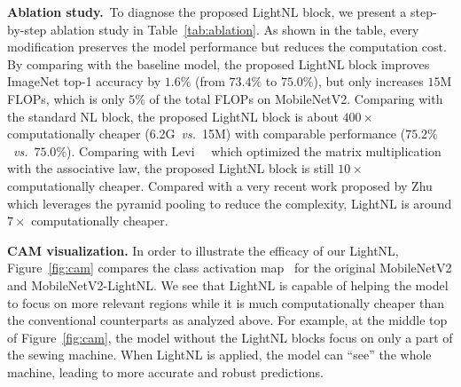 \documentclass[10pt,twocolumn,letterpaper]{article}
\begin{document}
\vspace{0.5ex}\noindent\textbf{Ablation study.}~To diagnose the proposed LightNL block, we present a step-by-step ablation study in Table~\ref{tab:ablation}. As shown in the table, every modification preserves the model performance but reduces the computation cost. By comparing with the baseline model, the proposed LightNL block improves ImageNet top-1 accuracy by $1.6\%$ (from $73.4\%$ to $75.0\%$), but only increases $15$M FLOPs, which is only $5\%$ of the total FLOPs on MobileNetV2. Comparing with the standard NL block, the proposed LightNL block is about $400\times$ computationally cheaper (6.2G~\emph{vs.}~15M) with comparable performance ($75.2\%$~\emph{vs.}~$75.0\%$). Comparing with Levi~\etal~\cite{levi2018efficient} which optimized the matrix multiplication with the associative law, the proposed LightNL block is still $10\times$ computationally cheaper. Compared with a very recent work proposed by Zhu~\etal~\cite{zhu2019asymmetric} which leverages the pyramid pooling to reduce the complexity, LightNL is around $7\times$ computationally cheaper.

\vspace{0.5ex}\noindent\textbf{CAM visualization.} 
In order to illustrate the efficacy of our LightNL, Figure~\ref{fig:cam} compares the class activation map~\cite{zhou2016learning} for the original MobileNetV2 and MobileNetV2-LightNL. We see that LightNL is capable of helping the model to focus on more relevant regions while it is much computationally cheaper than the conventional counterparts as analyzed above. For example, at the middle top of Figure~\ref{fig:cam}, the model without the LightNL blocks focus on only a part of the sewing machine. When LightNL is applied, the model can ``see'' the whole machine, leading to more accurate and robust predictions.
\end{document}
